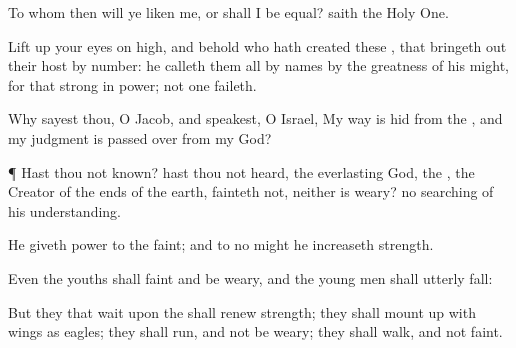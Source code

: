 {To whom then will ye
liken me, or shall I be
equal?
saith the Holy
One.

Lift
up your
eyes on
high, and
behold who hath
created these
{}, that bringeth
out their
host by
number: he
calleth them all by
names by the
greatness of his
might, for that
{}
strong in
power; not
one
faileth.


\par }{\PP {}Why
sayest thou, O
Jacob, and
speakest, O
Israel, My
way is
hid from the
{}, and my
judgment is passed
over from my
God?


\par }{\PP {}¶ Hast thou not
known? hast thou not
heard,
{} the
everlasting
God, the
{}, the
Creator of the
ends of the
earth,
fainteth not, neither is
weary?
{} no
searching of his
understanding.

He
giveth
power to the
faint; and to
{} no
might he
increaseth
strength.

Even the
youths shall
faint and be
weary, and the young
men shall
utterly
fall:

But they that
wait upon the
{} shall
renew
{}
strength; they shall mount
up with
wings as
eagles; they shall
run, and not be
weary;
{} they shall
walk, and not
faint.




\par }
